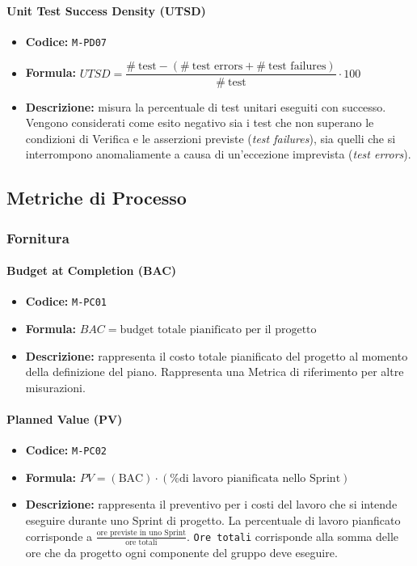 \documentclass[a4paper,12pt]{article}
\begin{document}
\paragraph{Unit Test Success Density (UTSD)}
\begin{itemize}
\item \textbf{Codice:} \texttt{M-PD07}
\item \textbf{Formula:} $UTSD = \dfrac{\#\ \text{test} - (\#\ \text{test errors} + 
\#\ \text{test failures})}{\#\ \text{test}} \cdot 100$
\item \textbf{Descrizione:} misura la percentuale di test unitari eseguiti con 
successo. Vengono considerati come esito negativo sia i test che non superano 
le condizioni di Verifica e le asserzioni previste (\textit{test failures}), 
sia quelli che si interrompono anomaliamente a causa di un'eccezione imprevista (\textit{test errors}).
\end{itemize}

\subsection{Metriche di Processo}

\subsubsection{Fornitura}

\paragraph{Budget at Completion (BAC)}
\begin{itemize}
    \item \textbf{Codice:} \texttt{M-PC01}
    \item \textbf{Formula:} $BAC=\text{budget totale pianificato per il progetto}$
    \item \textbf{Descrizione:} rappresenta il costo totale pianificato del progetto al momento della definizione del piano. Rappresenta una Metrica di riferimento per altre misurazioni.
\end{itemize}

\paragraph{Planned Value (PV)}
\begin{itemize}
    \item \textbf{Codice:} \texttt{M-PC02}
    \item \textbf{Formula:} $PV=(\text{BAC})\cdot(\text{\% di lavoro pianificata nello Sprint})$
    \item \textbf{Descrizione:} rappresenta il preventivo per i costi del lavoro che si intende eseguire durante uno Sprint di progetto. La percentuale di lavoro pianficato corrisponde a $\frac{\text{ore previste in uno Sprint}}{\text{ore totali}}$. \texttt{Ore totali} corrisponde alla somma delle ore che da progetto ogni componente del gruppo deve eseguire.
\end{itemize}
\end{document}
